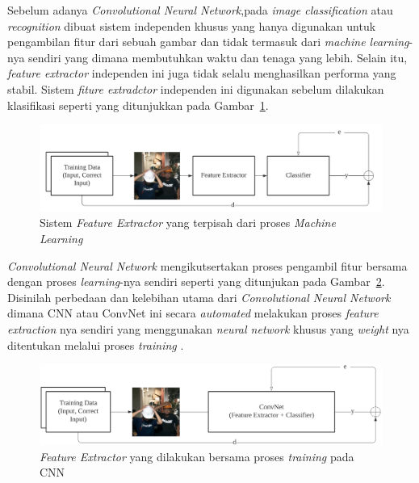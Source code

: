 \par Sebelum adanya \emph{Convolutional Neural Network},pada \emph{image classification} atau \emph{recognition} dibuat sistem independen khusus yang hanya digunakan
untuk pengambilan fitur dari sebuah gambar dan tidak termasuk dari \emph{machine learning}-nya sendiri yang dimana membutuhkan waktu dan tenaga yang lebih. Selain itu, \emph{feature extractor}
independen ini juga tidak selalu menghasilkan performa yang stabil. 
Sistem \emph{fiture extradctor} independen ini digunakan sebelum dilakukan klasifikasi seperti yang ditunjukkan pada Gambar~\ref{fig:imgecog_beforeconv}.


\begin{figure}[ht]
    \centering
    \includegraphics[width=1.0\textwidth]{gambar/imgrecog_beforconv.png}
    \caption{Sistem \emph{Feature Extractor} yang terpisah dari proses \emph{Machine Learning}}
    \label{fig:imgecog_beforeconv}  
\end{figure}

\par \emph{Convolutional Neural Network} mengikutsertakan proses pengambil fitur bersama dengan 
proses \emph{learning}-nya sendiri seperti yang ditunjukan pada Gambar~\ref{fig:imgrecog_afterconv}. Disinilah perbedaan dan kelebihan utama dari \emph{Convolutional Neural Network}
dimana CNN atau ConvNet ini secara \emph{automated} melakukan proses \emph{feature extraction} nya sendiri yang
menggunakan \emph{neural network} khusus yang \emph{weight} nya ditentukan melalui proses \emph{training} \cite{kim2018safety}.

\begin{figure}[ht]
    \centering
    \includegraphics[width=1.0\textwidth]{gambar/imgrecog_afterconv.png}
    \caption{\emph{Feature Extractor} yang dilakukan bersama proses \emph{training} pada CNN}
    \label{fig:imgrecog_afterconv}  
\end{figure}



